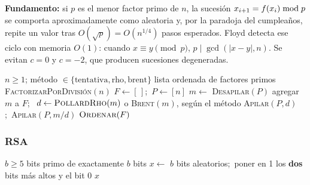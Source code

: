 \noindent\textbf{Fundamento:} si $p$ es el menor factor primo de $n$, la
sucesión $x_{i+1} = f(x_i) \bmod p$ se comporta aproximadamente como aleatoria
y, por la paradoja del cumpleaños, repite un valor tras
$O(\sqrt p) = O(n^{1/4})$ pasos esperados. Floyd detecta ese ciclo con memoria
$O(1)$: cuando $x \equiv y \pmod p$, $p \mid \gcd(|x-y|, n)$. Se evitan $c = 0$
y $c = -2$, que producen sucesiones degeneradas.

\begin{algorithm}[H]
\caption{\textsc{Factorizar}$(n, \text{método})$ \hfill fachada con pila explícita}
\begin{algorithmic}[1]
\Require $n \ge 1$; método $\in \{\text{tentativa}, \text{rho}, \text{brent}\}$
\Ensure lista ordenada de factores primos
 \Return \textsc{FactorizarPorDivisión}$(n)$ \EndIf
\State $F \gets [\,]$;\ $P \gets [n]$
  \State $m \gets$ \textsc{Desapilar}$(P)$
   \Continue \EndIf
   agregar $m$ a $F$;\ \Continue \EndIf {}
  \State $d \gets \textsc{PollardRho}(m)$ o \textsc{Brent}$(m)$, según el método
    \EndIf
  \State \textsc{Apilar}$(P, d)$;\ \textsc{Apilar}$(P, m/d)$
\EndWhile
\State \Return $\textsc{Ordenar}(F)$
\end{algorithmic}
\end{algorithm}

\subsubsection{RSA}

\begin{algorithm}[H]
\caption{\textsc{GenerarPrimo}$(b, \mathit{rng})$}
\begin{algorithmic}[1]
\Require $b \ge 5$ bits
\Ensure primo de exactamente $b$ bits
\Repeat
  \State $x \gets$ $b$ bits aleatorios;\ poner en 1 los \textbf{dos} bits más altos y el bit 0
\State \Return $x$
\end{algorithmic}
\end{algorithm}

